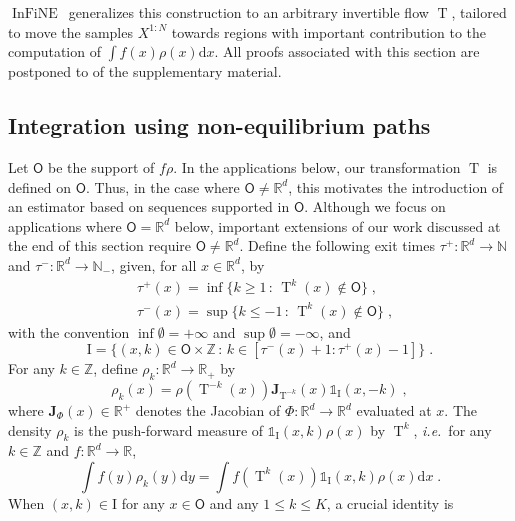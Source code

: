 \documentclass{article}
\def\IFIS{\ensuremath{\operatorname{InFiNE}}}
\def\transfo{\operatorname{T}}
\def\rmd{\operatorname{d}\hspace{-2pt}}
\def\rset{\mathbb{R}}
\def\nset{\mathbb{N}}
\def\dummy{f}
\def\rmd{\mathrm{d}}
\def\eqsp{\,}
\def\ie{\textit{i.e.}}
\def\eqsp{\;}
\newcommand{\1}{\mathds{1}}
\newcommand{\indi}[1]{\1_{#1}}
\def\Jac{\mathbf{J}}
\newcommand{\JacOp}[1]{\Jac_{#1}}
\newcommand{\intentier}[2]{[#1:#2]}
\def\rmi{\mathrm{I}}
\def\mso{\mathsf{O}}
\def\rset{\mathbb{R}}
\def\zset{\mathbb{Z}}
\def\nset{\mathbb{N}}
\def\rmd{\mathrm{d}}
\begin{document}
\IFIS\ generalizes
this construction to an arbitrary invertible flow
$\transfo$, tailored to move the samples $X^{1:N}$ towards regions with important contribution to the computation of
$\int f(x) \rho(x) \rmd x$. All proofs associated with this section are postponed to  of the supplementary material.

\subsection{Integration using non-equilibrium paths} \label{sec:estimator}
Let $\mso$ be the support of $f\rho$. In the applications below, our transformation $\transfo$ is defined on $\mso$. Thus,
in the case where $\mso \neq \rset^d$, this motivates the introduction of an estimator based on sequences supported in $\mso$.
Although we focus on applications where $\mso=\rset^d$ below, important extensions of our work discussed at the end of this section require $\mso\neq\rset^d$. Define the following exit times
$\tau^{+} : \rset^d \to \nset$ and $\tau^{-} : \rset^d \to \nset_-$, given, for
all $x \in \rset^d$, by
\begin{align}
\label{eq:definition-tau-+--}
&\tau^{+}(x)=\inf\{k\geq 1\, :  \,  \transfo^{k}(x) \not \in \mso\} \eqsp, \\
&\tau^{-}(x)=\sup\{k\leq -1\, :  \,  \transfo^{k}(x) \not \in \mso\} \eqsp,
\end{align}
with the convention $\inf \emptyset = +\infty$ and
$\sup \emptyset = - \infty$, and
\begin{equation}
  \label{eq:def_rmi}
  \rmi = \{(x,k) \in \mso\times \zset\,:\, k \in
\intentier{\tau^-(x)+1}{\tau^+(x)-1}\} \eqsp.
\end{equation}
For any $k \in \zset$, define $\rho_k : \rset^d \to \rset_+$ by
\begin{equation}
\label{eq:definition-rho-k}
    \rho_k(x)= \rho(\transfo^{-k}(x))
    \JacOp{\transfo^{-k}}(x) \indi{\rmi}(x,-k)\eqsp,
\end{equation}
where ${\JacOp{\Phi}(x)}\in\rset^+$ denotes the Jacobian of $\Phi: \rset^d\to \rset^d$ evaluated at $x$.
The density $\rho_k$ is the push-forward
measure of $\indi{\rmi}(x,k)\rho({x})$ by $\transfo^{k}$, \ie~for any $k \in \zset$ and  $f:\rset^d \to \rset$,
\begin{equation}
    \label{eq:inf_non_eq_av_0}
    \int \dummy(y)    \rho_k(y)\rmd y =
  \int \dummy(\transfo^{k}(x)) \indi{\rmi}(x,k)\rho(x)\rmd x  \eqsp.
\end{equation}
When $(x,k) \in \rmi$ for any $x \in \mso$ and any $1\le k\le K$, a crucial identity is
\end{document}
